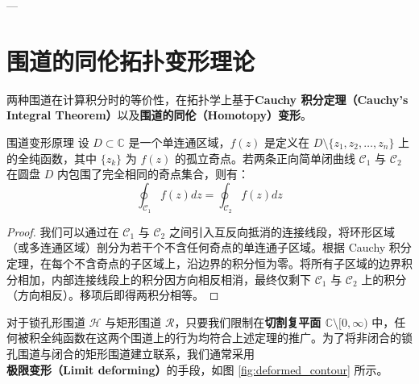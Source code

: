 ---

\section{围道的同伦拓扑变形理论}

两种围道在计算积分时的等价性，在拓扑学上基于\textbf{Cauchy 积分定理（Cauchy's Integral Theorem）}以及\textbf{围道的同伦（Homotopy）变形}。

\begin{theorem}{围道变形原理}{}
设 $D \subset \mathbb{C}$ 是一个单连通区域，$f(z)$ 是定义在 $D \setminus \{z_1, z_2, \dots, z_n\}$ 上的全纯函数，其中 $\{z_k\}$ 为 $f(z)$ 的孤立奇点。若两条正向简单闭曲线 $\mathcal{C}_1$ 与 $\mathcal{C}_2$ 在圆盘 $D$ 内包围了完全相同的奇点集合，则有：
\begin{equation}
    \oint_{\mathcal{C}_1} f(z) dz = \oint_{\mathcal{C}_2} f(z) dz
\end{equation}
\end{theorem}

\begin{proof}
我们可以通过在 $\mathcal{C}_1$ 与 $\mathcal{C}_2$ 之间引入互反向抵消的连接线段，将环形区域（或多连通区域）剖分为若干个不含任何奇点的单连通子区域。根据 Cauchy 积分定理，在每个不含奇点的子区域上，沿边界的积分恒为零。将所有子区域的边界积分相加，内部连接线段上的积分因方向相反相消，最终仅剩下 $\mathcal{C}_1$ 与 $\mathcal{C}_2$ 上的积分（方向相反）。移项后即得两积分相等。
\end{proof}

对于锁孔形围道 $\mathcal{H}$ 与矩形围道 $\mathcal{R}$，只要我们限制在\textbf{切割复平面 $\mathbb{C} \setminus [0,\infty)$} 中，任何被积全纯函数在这两个围道上的行为均符合上述定理的推广。为了将非闭合的锁孔围道与闭合的矩形围道建立联系，我们通常采用\textbf{极限变形（Limit deforming）}的手段，如图 \ref{fig:deformed_contour} 所示。


